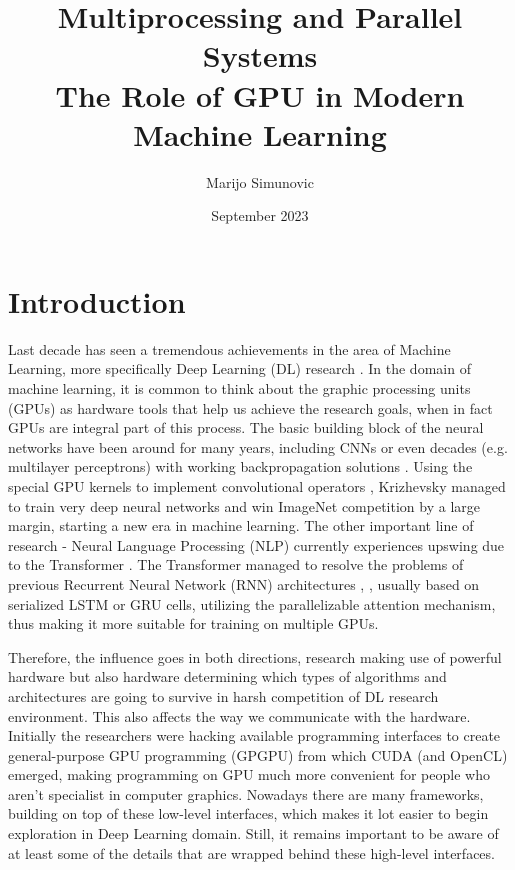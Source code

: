 \documentclass{article}
\title{Multiprocessing and Parallel Systems \\ The Role of GPU in Modern Machine Learning}
\author{Marijo Simunovic}
\date{September 2023}
\begin{document}
\maketitle

\section{Introduction}
Last decade has seen a tremendous achievements in the area of Machine Learning, more specifically Deep Learning (DL) research \cite{Goodfellow2016}.
In the domain of machine learning, it is common to think about the graphic processing units (GPUs) as hardware tools that help us achieve the research goals, when in fact GPUs are integral part of this process.
The basic building block of the neural networks have been around for many years, including CNNs \cite{Lecun1998} or even decades (e.g. multilayer perceptrons) with working backpropagation solutions \cite{Rumelhart1986}.
Using the special GPU kernels to implement convolutional operators \cite{Krizhevsky2012}, Krizhevsky managed to train very deep neural networks and win ImageNet \cite{Deng2009} competition by a large margin, starting a new era in machine learning.
The other important line of research - Neural Language Processing (NLP) currently experiences upswing due to the Transformer \cite{Vaswani2017}. The Transformer managed to resolve the problems of previous Recurrent Neural Network (RNN) architectures \cite{Bahdanau2014}, \cite{Graves2013}, usually based on serialized LSTM \cite{Hochreiter1997} or GRU \cite{Cho2014} cells, utilizing the parallelizable attention mechanism, thus making it more suitable for training on multiple GPUs.

Therefore, the influence goes in both directions, research making use of powerful hardware but also hardware
determining which types of algorithms and architectures are going to survive in harsh competition of DL research environment. This also affects the way we communicate with the hardware. Initially the researchers were hacking available programming interfaces \cite{Krueger2003} to create general-purpose GPU programming (GPGPU) from which CUDA (and OpenCL) emerged, making programming on GPU much more convenient for people who aren't specialist in computer graphics.
Nowadays there are many frameworks, building on top of these low-level interfaces, which makes it lot easier to begin exploration in Deep Learning domain.
Still, it remains important to be aware of at least some of the details that are wrapped behind these high-level interfaces.
\end{document}
